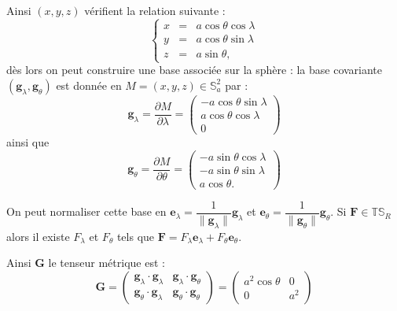 Ainsi $(x,y,z)$ vérifient la relation suivante :
\begin{equation}
\left\lbrace 
\begin{array}{rcl}
x & = & a \cos \theta \cos \lambda \\
y & = & a \cos \theta \sin \lambda \\
z & = & a \sin \theta,
\end{array}
\right.
\end{equation}
dès lors on peut construire une base associée sur la sphère : la base covariante $( \mathbf{g}_{\lambda}, \mathbf{g}_{\theta})$ est donnée en $M = (x,y,z) \in \mathbb{S}_a^2$ par :
\begin{equation}
\mathbf{g}_{\lambda} = \dfrac{\partial M}{\partial \lambda} = \begin{pmatrix}
- a \cos \theta \sin \lambda \\ 
a \cos \theta \cos \lambda \\ 
0
\end{pmatrix} 
\end{equation}
ainsi que 
\begin{equation}\label{coord_latlon}
\mathbf{g}_{\theta} = \dfrac{\partial M}{\partial \theta} = \begin{pmatrix}
- a \sin \theta \cos \lambda \\ 
- a \sin \theta \sin \lambda \ \\ 
a \cos \theta.
\end{pmatrix} 
\end{equation}

\begin{remarque}
\label{base_lonlat}
On peut normaliser cette base en $\mathbf{e}_{\lambda} = \dfrac{1}{\| \mathbf{g}_{\lambda} \|} \mathbf{g}_{\lambda}$ et $\mathbf{e}_{\theta} = \dfrac{1}{\| \mathbf{g}_{\theta} \|} \mathbf{g}_{\theta}$. Si $\mathbf{F} \in \mathbb{T}\mathbb{S}_R$ alors il existe $F_{\lambda}$ et $F_{\theta}$ tels que $\mathbf{F} = F_{\lambda} \mathbf{e}_{\lambda} + F_{\theta} \mathbf{e}_{\theta}$.
\end{remarque}

Ainsi $\mathbf{G}$ le tenseur métrique est :
\begin{equation}
\mathbf{G} = 
\begin{pmatrix}
\mathbf{g}_{\lambda} \cdot \mathbf{g}_{\lambda} & \mathbf{g}_{\lambda} \cdot \mathbf{g}_{\theta} \\
\mathbf{g}_{\theta} \cdot \mathbf{g}_{\lambda} & \mathbf{g}_{\theta} \cdot \mathbf{g}_{\theta}
\end{pmatrix}
 =
\begin{pmatrix}
a^2 \cos \theta & 0 \\
0 & a^2
\end{pmatrix}
\end{equation}

